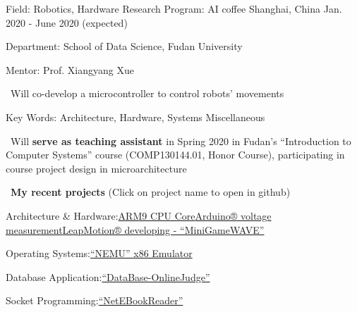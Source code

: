 

\begin{cventries}

  \cventry
    {Field: Robotics, Hardware} %
    {Research Program: AI coffee} %
    {Shanghai, China} %
    {Jan. 2020 - June 2020 (expected)} %
    {
      \begin{cvitems} %
        \item {Department: School of Data Science, Fudan University}
        \item {Mentor: Prof. Xiangyang Xue}
        \item {\bullet\ }{Will co-develop a microcontroller to control robots' movements}
      \end{cvitems}
    }

  \cventry
    {Key Words: Architecture, Hardware, Systems} %
    {Miscellaneous} %
    {} %
    {} %
    {
      \begin{cvitems}
        \item {\bullet\ }{Will \textbf{serve as teaching assistant} in Spring 2020 in Fudan’s ``Introduction to Computer Systems'' course (COMP130144.01, Honor Course), participating in course project design in microarchitecture}
        \item {\bullet\ }{\textbf{My recent projects}{ (Click on project name to open in github)}}
        \item {\quad}{Architecture \& Hardware:\quad\href{https://github.com/jasha64/ARM9-compatible-soft-CPU-core}{ARM9 CPU Core}\quad\href{https://github.com/jasha64/jasha64/tree/master/Fall\%202019/Hardware\%20Experiments/Arduino}{Arduino® voltage measurement}\quad\href{https://github.com/jasha64/jasha64/tree/master/Fall\%202019/Hardware\%20Experiments/LeapMotion}{LeapMotion® developing - “MiniGameWAVE”}}
        \item {\quad}{Operating Systems:\quad\href{https://github.com/jasha64/ics2015}{“NEMU” x86 Emulator}}
        \item {\quad}{Database Application:\quad\href{https://github.com/jasha64/DataBase-OnlineJudge}{“DataBase-OnlineJudge”}}
        \item {\quad}{Socket Programming:\quad\href{https://github.com/jasha64/jasha64/tree/master/Fall\%202019/Computer\%20Networks}{“NetEBookReader”}}
      \end{cvitems}
    }

\end{cventries}
